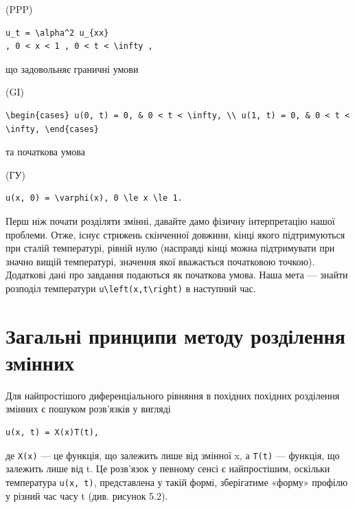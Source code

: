 \documentclass[
  ukrainian,
]{article}
\begin{document}
(PPP)

\begin{verbatim}
u_t = \alpha^2 u_{xx}
, 0 < x < 1 , 0 < t < \infty ,
\end{verbatim}

що задовольняє граничні умови

(GI)

\begin{verbatim}
\begin{cases} u(0, t) = 0, & 0 < t < \infty, \\ u(1, t) = 0, & 0 < t < \infty, \end{cases}
\end{verbatim}

та початкова умова

(ГУ)

\begin{verbatim}
u(x, 0) = \varphi(x), 0 \le x \le 1.
\end{verbatim}

Перш ніж почати розділяти змінні, давайте дамо фізичну інтерпретацію
нашої проблеми. Отже, існує стрижень скінченної довжини, кінці якого
підтримуються при сталій температурі, рівній нулю (насправді кінці можна
підтримувати при значно вищій температурі, значення якої вважається
початковою точкою). Додаткові дані про завдання подаються як початкова
умова. Наша мета --- знайти розподіл температури
\texttt{u\textbackslash{}left(x,t\textbackslash{}right)} в наступний
час.

\section{Загальні принципи методу розділення
змінних}\label{ux437ux430ux433ux430ux43bux44cux43dux456-ux43fux440ux438ux43dux446ux438ux43fux438-ux43cux435ux442ux43eux434ux443-ux440ux43eux437ux434ux456ux43bux435ux43dux43dux44f-ux437ux43cux456ux43dux43dux438ux445}

Для найпростішого диференціального рівняння в похідних похідних
розділення змінних є пошуком розв'язків у вигляді

\begin{verbatim}
u(x, t) = X(x)T(t),
\end{verbatim}

де \texttt{X(x)} --- це функція, що залежить лише від змінної x, а
\texttt{T(t)} --- функція, що залежить лише від t. Це розв'язок у
певному сенсі є найпростішим, оскільки температура \texttt{u(x,\ t)},
представлена у такій формі, зберігатиме «форму» профілю у різний час
часу t (див. рисунок 5.2).
\end{document}
